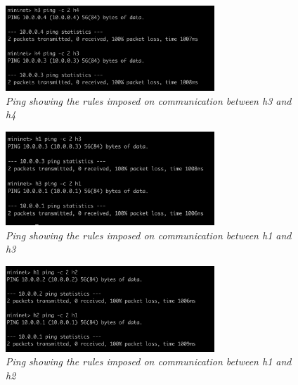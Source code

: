 \begin{figure}[!ht]
\centering
\includegraphics*[width=0.7\textwidth]{images/o7.png}
\caption{\em Ping showing the rules imposed on communication between h3 and h4}
\label{img:o7}
\end{figure}

\begin{figure}[!ht]
\centering
\includegraphics*[width=0.7\textwidth]{images/o8.png}
\caption{\em Ping showing the rules imposed on communication between h1 and h3}
\label{img:o8}
\end{figure}

\begin{figure}[!ht]
\centering
\includegraphics*[width=0.7\textwidth]{images/o9.png}
\caption{\em Ping showing the rules imposed on communication between h1 and h2}
\label{img:o9}
\end{figure}